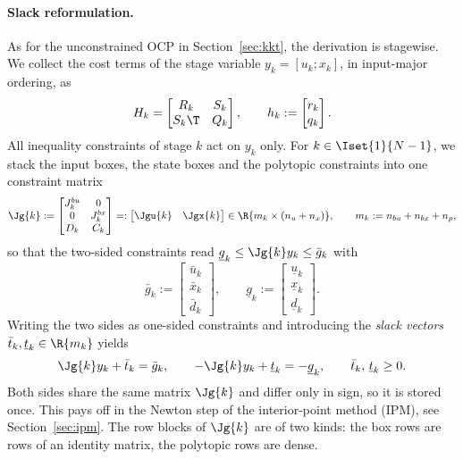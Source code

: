 \paragraph{Slack reformulation.}
As for the unconstrained OCP in Section~\ref{sec:kkt}, the derivation is stagewise.
We collect the cost terms of the stage variable $y_k = [u_k; x_k]$, in input-major ordering, as
\[
    H_k = \begin{bmatrix} R_k & S_k \\ S_k\T & Q_k \end{bmatrix},
    \qquad
    h_k := \begin{bmatrix} r_k \\ q_k \end{bmatrix}.
\]
All inequality constraints of stage $k$ act on $y_k$ only.
For $k\in\Iset{1}{N-1}$, we stack the input boxes, the state boxes and the polytopic constraints into one constraint matrix
\[
    \Jg{k} :=
    \begin{bmatrix}
        J_k^{bu} & 0        \\
        0        & J_k^{bx} \\
        D_k      & C_k
    \end{bmatrix}
    =: \begin{bmatrix} \Jgu{k} & \Jgx{k} \end{bmatrix}
    \in \R{m_k \times (n_u + n_x)},
    \qquad
    m_k := n_{bu} + n_{bx} + n_p ,
\]
so that the two-sided constraints read $\underline{g}_k \leq \Jg{k} y_k \leq \bar{g}_k$ with
\[
    \bar{g}_k := \begin{bmatrix} \bar{u}_k \\ \bar{x}_k \\ \bar{d}_k \end{bmatrix},
    \qquad
    \underline{g}_k := \begin{bmatrix} \underline{u}_k \\ \underline{x}_k \\ \underline{d}_k \end{bmatrix}.
\]
Writing the two sides as one-sided constraints and introducing the \textit{slack vectors} $\bar{t}_k, \underline{t}_k \in \R{m_k}$ yields
\[
    \Jg{k} y_k + \bar{t}_k = \bar{g}_k,
    \qquad
    -\Jg{k} y_k + \underline{t}_k = -\underline{g}_k,
    \qquad
    \bar{t}_k,\, \underline{t}_k \geq 0 .
\]
Both sides share the same matrix $\Jg{k}$ and differ only in sign, so it is stored once.
This pays off in the Newton step of the interior-point method (IPM), see Section~\ref{sec:ipm}.
The row blocks of $\Jg{k}$ are of two kinds: the box rows are rows of an identity matrix, the polytopic rows are dense.

